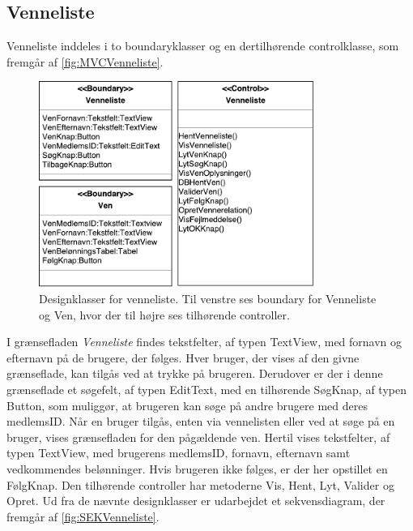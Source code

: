 \subsection*{Venneliste}
Venneliste inddeles i to boundaryklasser og en dertilhørende controlklasse, som fremgår af \autoref{fig:MVCVenneliste}. 

\begin{figure} [H]
\centering
\includegraphics[width=0.8\textwidth]{figures/MVC/MVCVenneliste}
\caption{Designklasser for venneliste. Til venstre ses boundary for Venneliste og Ven, hvor der til højre ses tilhørende controller.}
\label{fig:MVCVenneliste}
\end{figure}

\noindent
I grænsefladen \textit{Venneliste} findes tekstfelter, af typen TextView, med fornavn og efternavn på de brugere, der følges. Hver bruger, der vises af den givne grænseflade, kan tilgås ved at trykke på brugeren. Derudover er der i denne grænseflade et søgefelt, af typen EditText, med en tilhørende SøgKnap, af typen Button, som muliggør, at brugeren kan søge på andre brugere med deres medlemsID. 
Når en bruger tilgås, enten via vennelisten eller ved at søge på en bruger, vises grænsefladen for den pågældende ven. Hertil vises  tekstfelter, af typen TextView, med brugerens medlemsID, fornavn, efternavn samt vedkommendes belønninger. Hvis brugeren ikke følges, er der her opstillet en FølgKnap.
Den tilhørende controller har metoderne Vis, Hent, Lyt, Valider og Opret. 
Ud fra de nævnte designklasser er udarbejdet et sekvensdiagram, der fremgår af \autoref{fig:SEKVenneliste}.

